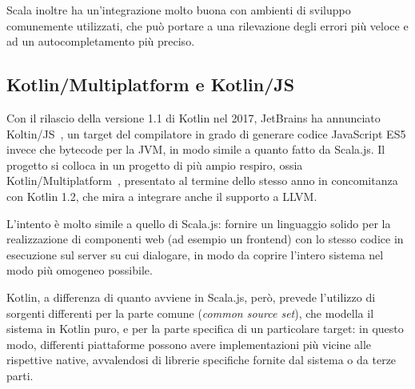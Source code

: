       Scala inoltre ha un'integrazione molto buona con ambienti di sviluppo comunemente utilizzati, che può portare a una rilevazione degli errori più veloce e ad un autocompletamento più preciso.

    \subsection{Kotlin/Multiplatform e Kotlin/JS}\label{subsec:kotlinjs}
      Con il rilascio della versione 1.1 di Kotlin nel 2017, JetBrains ha annunciato Koltin/JS~\cite{Belov2017}, un target del compilatore in grado di generare codice JavaScript ES5 invece che bytecode per la JVM, in modo simile a quanto fatto da Scala.js.
      Il progetto si colloca in un progetto di più ampio respiro, ossia Kotlin/Multiplatform~\cite{Jemerov2017}, presentato al termine dello stesso anno in concomitanza con Kotlin 1.2, che mira a integrare anche il supporto a LLVM\@.

      L'intento è molto simile a quello di Scala.js:
      fornire un linguaggio solido per la realizzazione di componenti web (ad esempio un frontend) con lo stesso codice in esecuzione sul server su cui dialogare, in modo da coprire l'intero sistema nel modo più omogeneo possibile.

      Kotlin, a differenza di quanto avviene in Scala.js, però, prevede l'utilizzo di sorgenti differenti per la parte comune (\emph{common source set}), che modella il sistema in Kotlin puro, e per la parte specifica di un particolare target:
      in questo modo, differenti piattaforme possono avere implementazioni più vicine alle rispettive native, avvalendosi di librerie specifiche fornite dal sistema o da terze parti.

